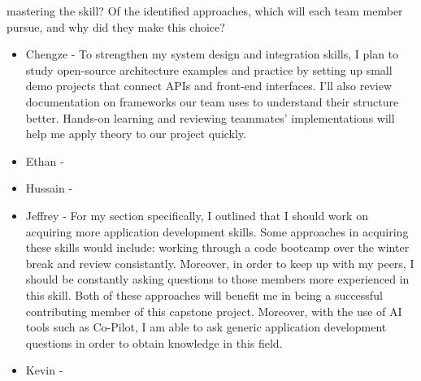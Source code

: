 \begin{enumerate}
  mastering the skill?  Of the identified approaches, which will each team
  member pursue, and why did they make this choice?
  \begin{itemize}
        \item Chengze - To strengthen my system design and integration skills, 
        I plan to study open-source architecture examples and practice by setting 
        up small demo projects that connect APIs and front-end interfaces. I’ll also 
        review documentation on frameworks our team uses to understand their structure 
        better. Hands-on learning and reviewing teammates’ implementations will help 
        me apply theory to our project quickly.
        \item Ethan - 
        \item Hussain - 
        \item Jeffrey - For my section specifically, I outlined that I should
        work on acquiring more application development skills. Some approaches
        in acquiring these skills would include: working through a code
        bootcamp over the winter break and review consistantly. Moreover,
        in order to keep up with my peers, I should be constantly asking
        questions to those members more experienced in this skill. Both
        of these approaches will benefit me in being a successful 
        contributing member of this capstone project. Moreover, with 
        the use of AI tools such as Co-Pilot, I am able to ask generic
        application development questions in order to obtain knowledge
        in this field.
        \item Kevin - 
  \end{itemize} 
\end{enumerate}
